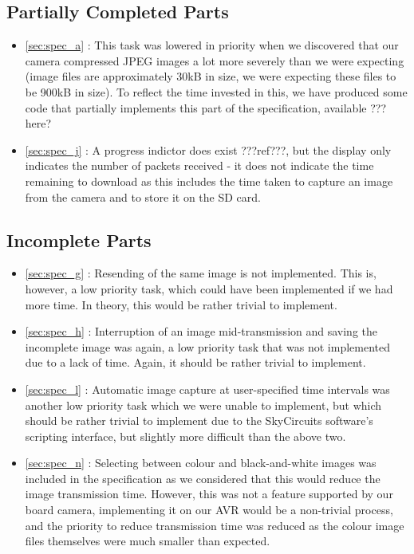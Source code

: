\subsection{Partially Completed Parts}

\begin{itemize}
\item \ref{sec:spec_a} : This task was lowered in priority when we discovered 
that our camera compressed JPEG images a lot more severely than we were 
expecting (image files are approximately 30kB in size, we were expecting 
these files to be 900kB in size). To reflect the time invested in this, we 
have produced some code that partially implements this part of the 
specification, available ???here?
\item \ref{sec:spec_j} : A progress indictor does exist ???ref???, but the 
display only indicates the number of packets received - it does not 
indicate the time remaining to download as this includes the time taken to 
capture an image from the camera and to store it on the SD card.
\end{itemize}

\subsection{Incomplete Parts}
\label{sec:incomplete}

\begin{itemize}
\item \ref{sec:spec_g} : Resending of the same image is not implemented. 
This is, however, a low priority task, which could have been implemented 
if we had more time. In theory, this would be rather trivial to implement.
\item \ref{sec:spec_h} : Interruption of an image mid-transmission and 
saving the incomplete image was again, a low priority task that was not 
implemented due to a lack of time. Again, it should be rather trivial to 
implement.
\item \ref{sec:spec_l} : Automatic image capture at user-specified time 
intervals was another low priority task which we were unable to implement, 
but which should be rather trivial to implement due to the SkyCircuits 
software's scripting interface, but slightly more difficult than the above
two.
\item \ref{sec:spec_n} : Selecting between colour and black-and-white images 
was included in the specification as we considered that this would reduce 
the image transmission time. However, this was not a feature supported 
by our board camera, implementing it on our AVR would be a non-trivial 
process, and the priority to reduce transmission time was reduced as the 
colour image files themselves were much smaller than expected.
\end{itemize}


